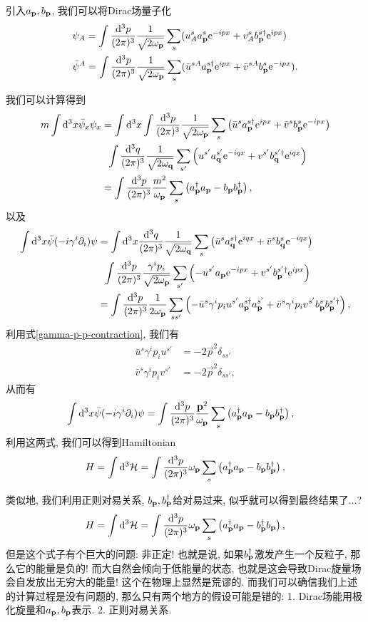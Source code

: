 引入$a_{\mathbf{p}}, b_{\mathbf{p}}$, 我们可以将Dirac场量子化
\begin{align}
    &\psi_A=\int\ldsq{p}\sum_s(u^s_A\a{p}^s\exp{-ipx}+v^{s}_A\b{p}^{s\dagger}\exp{ipx})\\
    &\bar\psi^A=\int\ldsq{p}\sum_s(\bar u^{sA}\a{p}^{s\dagger}\exp{ipx}+\bar v^{sA}\b{p}^{s}\exp{-ipx}).
\end{align}

我们可以计算得到
\begin{align}
    m\int\d^3x\bar\psi_x\psi_x&=\int\d^3x\int\ldsq p\sum_s\left(\bar u^s\a p^{s\dagger}\exp{ipx}+\bar v^s\b p^s\exp{-ipx}\right)\notag\\
    &\;\;\int\ldsq q\sum_{s'}\left(u^{s'}\a q^{s'}\exp{-iqx}+v^{s'}\b q^{s'\dagger}\exp{iqx}\right)\\
    &=\int\ddd p\frac{m^2}{\om p}\sum_s\left(\a p^\dagger\a p-\b p\b p^\dagger\right),
\end{align}
以及
\begin{align}
    \int\d^3x\bar\psi(-i\gamma^i\partial_i)\psi&=\int\d^3x\ldsq q\sum_s\left(\bar u^s\a q^{s\dagger}\exp{iqx}+\bar v^s\b q^s\exp{-iqx}\right)\notag\\
    &\;\;\int\ldsq p[\gamma^ip_i]\sum_{s'}\left(-u^{s'}\a p\exp{-ipx}+v^{s'}\b p^{s'\dagger}\exp{ipx}\right)\\
    &=\int\ld p\sum_{ss'}\left(-\bar u^s\gamma^ip_i u^{s'}\a p^{s\dagger}\a p^{s'}+\bar v^s\gamma^ip_iv^{s'}\b p^s\b p^{s'\dagger}\right),
\end{align}
利用式\eqref{gamma-p-p-contraction}, 我们有
\begin{align}
    \bar u^s\gamma^ip_i u^{s'}&=-2\vec p^2\delta_{ss'}\\
    \bar v^s\gamma^ip_i v^{s'}&=-2\vec p^2\delta_{ss'},
\end{align}
从而有
\begin{align}
    \int\mathrm d^3x\bar\psi(-i\gamma^i\partial_i)\psi&=\int\frac{\mathrm d^3p}{(2\pi)^3}\frac{\mathbf{p}^2}{\omega_{\mathbf{p}}}\sum_s\left(a_{\mathbf{p}}^\dagger a_{\mathbf{p}}-b_{\mathbf{p}}b_{\mathbf{p}}^\dagger\right),
\end{align}
利用这两式, 我们可以得到Hamiltonian
\begin{equation}
    H=\int\mathrm d^3\mathcal H=\int\frac{\mathrm d^3p}{(2\pi)^3}\omega_{\mathbf{p}}\sum_s\left(a_{\mathbf{p}}^\dagger a_{\mathbf{p}}-b_{\mathbf{p}}b_{\mathbf{p}}^\dagger\right),
\end{equation}

类似地, 我们利用正则对易关系, $b_{\mathbf{p}}, b_{\mathbf{p}}^\dagger$给对易过来, 似乎就可以得到最终结果了...?
\begin{equation}
    H=\int\mathrm d^3\mathcal H=\int\frac{\mathrm d^3p}{(2\pi)^3}\omega_{\mathbf{p}}\sum_s\left(a_{\mathbf{p}}^\dagger a_{\mathbf{p}}-b_{\mathbf{p}}^\dagger b_{\mathbf{p}}\right),
\end{equation}
但是这个式子有个巨大的问题: 非正定! 也就是说, 如果$b_{\mathbf{p}}^\dagger$激发产生一个反粒子, 那么它的能量是负的! 而大自然会倾向于低能量的状态, 也就是这会导致Dirac旋量场会自发放出无穷大的能量! 这个在物理上显然是荒谬的. 而我们可以确信我们上述的计算过程是没有问题的, 那么只有两个地方的假设可能是错的: 1. Dirac场能用极化旋量和$a_{\mathbf{p}}, b_{\mathbf{p}}$表示. 2. 正则对易关系.

